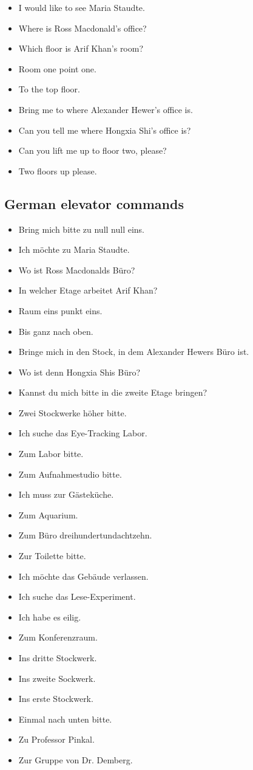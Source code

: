 \documentclass[a4paper, 12pt]{article}
\begin{document}
\begin{appendix}
\begin{itemize}
\item I would like to see Maria Staudte.
\item Where is Ross Macdonald's office?
\item Which floor is Arif Khan's room?
\item Room one point one.
\item To the top floor.
\item Bring me to where Alexander Hewer's office is.
\item Can you tell me where Hongxia Shi's office is?
\item Can you lift me up to floor two, please?
\item Two floors up please.
\end{itemize}



\subsection{German elevator commands}
\begin{itemize}
\item Bring mich bitte zu null null eins.
\item Ich möchte zu Maria Staudte.
\item Wo ist Ross Macdonalds Büro?
\item In welcher Etage arbeitet Arif Khan?
\item Raum eins punkt eins.
\item Bis ganz nach oben.
\item Bringe mich in den Stock, in dem Alexander Hewers Büro ist.
\item Wo ist denn Hongxia Shis Büro?
\item Kannst du mich bitte in die zweite Etage bringen?
\item Zwei Stockwerke höher bitte.
\item Ich suche das Eye-Tracking Labor.
\item Zum Labor bitte.
\item Zum Aufnahmestudio bitte.
\item Ich muss zur Gästeküche.
\item Zum Aquarium.
\item Zum Büro dreihundertundachtzehn.
\item Zur Toilette bitte.
\item Ich möchte das Gebäude verlassen.
\item Ich suche das Lese-Experiment.
\item Ich habe es eilig.
\item Zum Konferenzraum.
\item Ins dritte Stockwerk.
\item Ins zweite Sockwerk.
\item Ins erste Stockwerk.
\item Einmal nach unten bitte.
\item Zu Professor Pinkal.
\item Zur Gruppe von Dr. Demberg.
\end{itemize}



\end{appendix}
\end{document}
